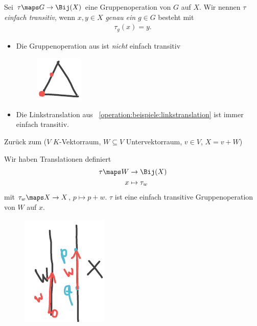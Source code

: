 \begin{definition*}
    Sei \( \tau\maps G\to \Bij(X) \) eine Gruppenoperation von \( G \) auf \( X \). 
    Wir nennen \( \tau \) \emph{einfach transitiv}, wenn \tforall \( x,y\in X \) \emph{genau ein} \( g\in G \) besteht mit
    \begin{align*}
        \tau_g(x)=y.
    \end{align*}
\end{definition*}
\begin{beispiel*}
    \begin{itemize}
        \item Die Gruppenoperation aus  ist \emph{nicht} einfach transitiv
        \begin{figure}[H]
            \centering
            \includegraphics[width=0.2\linewidth]{figures/d_3_nicht_einfach_transitiv}
            \label{fig:d_3_nicht_einfach_transitiv}
        \end{figure}
        
        \item Die Linkstranslation aus ~\ref{operation:beispiele:linkstranslation} ist immer einfach transitiv.
    \end{itemize}
\end{beispiel*}
Zurück zum  (\( V \) \( K \)-Vektorraum, \( W\subseteq V \) Untervektorraum, \( v\in V \), \( X=v+W \))

Wir haben Translationen definiert
\begin{align*}
    \tau\maps \begin{aligned}[t] 
        W&\to \Bij(X)\\
        x&\mapsto \tau_w
    \end{aligned}
\end{align*}
mit \( \tau_w\maps X\to X \), \( p\mapsto p+w \). 
\( \tau \) ist eine einfach transitive Gruppenoperation von \( W \) auf \( x \).

\begin{figure}[H]
    \centering
    \includegraphics[width=0.2\linewidth]{figures/affiner_unterraum_einfach_transitive_gruppenoperation}
    \label{fig:affiner_unterraum_einfach_transitive_gruppenoperation}
\end{figure}

